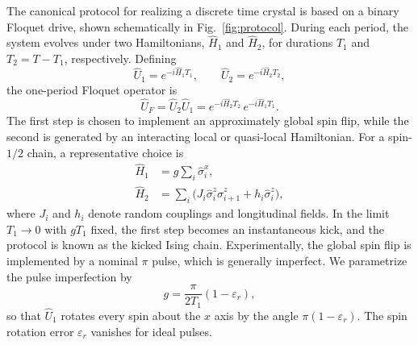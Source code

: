 \documentclass[%
reprint,
superscriptaddress,
amsmath,amssymb,
aps,
prb,
showkeys,%
floatfix,
]{revtex4-2}
\let\cite\citep   %
\begin{document}
	The canonical protocol for realizing a discrete time crystal is based on a binary Floquet drive, shown schematically in Fig.~\ref{fig:protocol}. During each period, the system evolves under two Hamiltonians, $\hat{H}_1$ and $\hat{H}_2$, for durations $T_1$ and $T_2=T-T_1$, respectively. Defining
	\begin{equation}
		\hat{U}_1=e^{-i\hat{H}_1T_1},
		\qquad
		\hat{U}_2=e^{-i\hat{H}_2T_2},
	\end{equation}
	the one-period Floquet operator is
	\begin{equation}
		\hat{U}_F=\hat{U}_2\hat{U}_1=e^{-i\hat{H}_2T_2}\,e^{-i\hat{H}_1T_1}.
		\label{eq:binary_floquet}
	\end{equation}
	The first step is chosen to implement an approximately global spin flip, while the second is generated by an interacting local or quasi-local Hamiltonian. For a spin-$1/2$ chain, a representative choice is~\cite{YaoPRL2017}
	\begin{equation}
		\begin{aligned}
			\hat{H}_1&=g\sum_i\hat{\sigma}_i^x,\\
			\hat{H}_2&=\sum_i\big(J_i\hat{\sigma}_i^z\hat{\sigma}_{i+1}^z+h_i\hat{\sigma}_i^z\big),
		\end{aligned}
		\label{eq:binary_model}
	\end{equation}
	where $J_i$ and $h_i$ denote random couplings and longitudinal fields. In the limit $T_1\to0$ with $gT_1$ fixed, the first step becomes an instantaneous kick, and the protocol is known as the kicked Ising chain. Experimentally, the global spin flip is implemented by a nominal $\pi$ pulse, which is generally imperfect. We parametrize the pulse imperfection by
	\begin{equation}
		g=\frac{\pi}{2T_1}\left(1-\varepsilon_r\right),
		\label{eq:pulse_error}
	\end{equation}
	so that $\hat{U}_1$ rotates every spin about the $x$ axis by the angle $\pi(1-\varepsilon_r)$. The spin rotation error $\varepsilon_r$ vanishes for ideal pulses.
	
\end{document}

